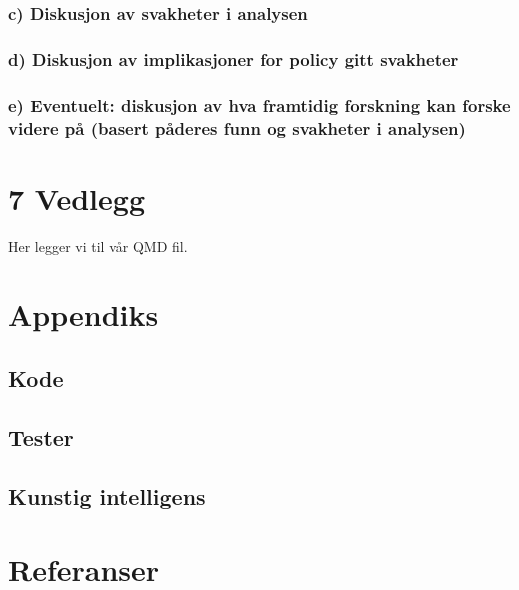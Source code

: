 \documentclass[
  12pt,
  a4paper,
  DIV=11,
  numbers=noendperiod]{scrartcl}
\begin{document}
\subsubsection{c) Diskusjon av svakheter i
analysen}\label{c-diskusjon-av-svakheter-i-analysen}

\subsubsection{d) Diskusjon av implikasjoner for policy gitt
svakheter}\label{d-diskusjon-av-implikasjoner-for-policy-gitt-svakheter}

\subsubsection{e) Eventuelt: diskusjon av hva framtidig forskning kan
forske videre på (basert påderes funn og svakheter i
analysen)}\label{e-eventuelt-diskusjon-av-hva-framtidig-forskning-kan-forske-videre-puxe5-basert-puxe5deres-funn-og-svakheter-i-analysen}

\newpage

\section{7 Vedlegg}\label{vedlegg}

Her legger vi til vår QMD fil.

\section{Appendiks}\label{appendiks}

\subsection{Kode}\label{kode}

\subsection{Tester}\label{tester}

\subsection{Kunstig intelligens}\label{kunstig-intelligens}

\newpage

\clearpage

\section{Referanser}\label{referanser}
\end{document}
